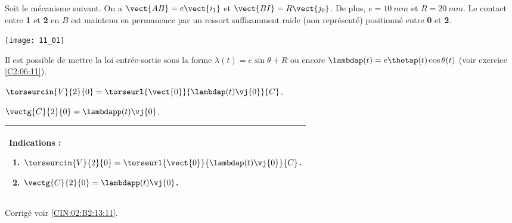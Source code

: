 \normaltrue \difficilefalse \tdifficilefalse
\correctiontrue


\setcounter{question}{0}%
\ifcorrection
\else
{}
\fi

\ifprof
\else
Soit le mécanisme suivant. On a $\vect{AB}=e\vect{i_1}$ et $\vect{BI}=R\vect{j_0}$. De plus, 
$e=\SI{10}{mm}$ et $R=\SI{20}{mm}$. Le contact entre \textbf{1} et \textbf{2} en $B$ est maintenu en permanence par un ressort suffisamment raide (non représenté) positionné entre \textbf{0} et \textbf{2}. 
\begin{marginfigure}
\texttt{[image: 11\_01]}
\end{marginfigure}
\fi

Il est possible de mettre la loi entrée-sortie sous la forme $ \lambda(t) = e\sin\theta +R $
ou encore $\lambdap (t)=e\thetap(t) \cos\theta (t)$  (voir exercice \ref{C2:06:11}).


\ifprof
$\torseurcin{V}{2}{0} = \torseurl{\vect{0}}{\lambdap (t)\vj{0}}{C}$.
\else
\fi

\ifprof
$\vectg{C}{2}{0} = \lambdapp (t)\vj{0}$.
\else
\fi

\ifprof
\else
\footnotesize
\ifcolle
\else
\begin{marginfigure}
\begin{tabular}{|p{.9\linewidth}|}
\hline
Indications :
\begin{enumerate}
\item $\torseurcin{V}{2}{0} = \torseurl{\vect{0}}{\lambdap (t)\vj{0}}{C}$.
\item $\vectg{C}{2}{0} = \lambdapp (t)\vj{0}$.
\end{enumerate} \\ \hline
\end{tabular}
\end{marginfigure}
\fi
\normalsize
\begin{flushright}
\footnotesize{Corrigé  voir \ref{CIN:02:B2:13:11}.}
\end{flushright}%
\fi